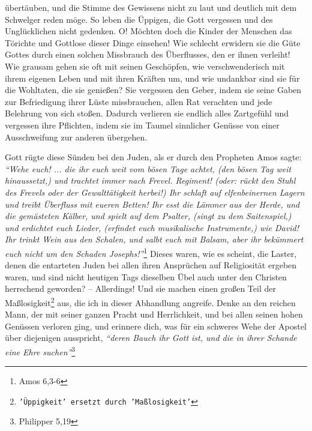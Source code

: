 übertäuben, und die
Stimme des Gewissens nicht zu laut und deutlich mit
dem Schwelger
reden möge. So
leben die Üppigen, die Gott vergessen und des Unglücklichen nicht gedenken. O!
Möchten doch die Kinder der Menschen das Törichte und Gottlose dieser Dinge
einsehen! Wie schlecht erwidern sie die Güte Gottes durch einen solchen
Missbrauch des Überflusses, den er ihnen verleiht! Wie grausam gehen sie oft
mit seinen Geschöpfen, wie verschwenderisch mit ihrem
eigenen Leben und mit
ihren Kräften um, und wie undankbar sind sie für die Wohltaten,
die sie
genießen? Sie vergessen den Geber, indem sie seine Gaben zur Befriedigung ihrer
Lüste missbrauchen, allen Rat verachten und jede Belehrung von sich stoßen.
Dadurch verlieren sie endlich alles Zartgefühl und vergessen ihre
Pflichten,
indem sie im Taumel sinnlicher Genüsse von einer Ausschweifung zur anderen
übergehen.

\medskip

Gott rügte diese Sünden bei den Juden, als er durch den
Propheten Amos sagte:
\textit{"`Wehe euch! ... die ihr euch weit vom bösen Tage achtet, (den bösen Tag
weit
hinaussetzt,) und trachtet immer nach Frevel. Regiment! (oder: rückt den Stuhl
des Frevels oder der Gewalttätigkeit herbei!) Ihr schlaft auf elfenbeinernen
Lagern und treibt Überfluss mit eueren Betten! Ihr esst die Lämmer aus der
Herde, und die gemästeten Kälber, und spielt auf dem Psalter, (singt zu dem
Saitenspiel,) und erdichtet euch Lieder, (erfindet euch musikalische
Instrumente,) wie David! Ihr trinkt Wein aus den Schalen, und salbt euch mit
Balsam, aber ihr bekümmert euch nicht um den Schaden Josephs!"'}\footnote{Amos
6,3-6}
Dieses waren, wie es scheint, die Laster, denen die entarteten
Juden bei allen ihren Ansprüchen auf
Religiosität ergeben waren,
und sind nicht
heutigen Tags dieselben Übel auch unter den Christen
herrschend geworden? --
Allerdings! Und sie machen einen großen Teil der
Maßlosigkeit\footnote{\texttt{'Üppigkeit' ersetzt
durch 'Maßlosigkeit'}} aus, die ich in
dieser Abhandlung angreife. Denke an den reichen Mann, der mit seiner ganzen
Pracht und Herrlichkeit, und bei allen seinen hohen Genüssen verloren ging, und
erinnere dich, was für ein schweres Wehe der Apostel über diejenigen ausspricht,
\textit{"`deren Bauch ihr Gott ist, und die in ihrer Schande eine Ehre
suchen"'}\footnote{Philipper 5,19}

